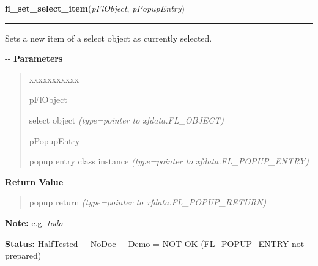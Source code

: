 \hspace{.8\funcindent}\begin{boxedminipage}{\funcwidth}

    \raggedright \textbf{fl\_set\_select\_item}(\textit{pFlObject}, \textit{pPopupEntry})

    \vspace{-1.5ex}

    \rule{\textwidth}{0.5\fboxrule}
\setlength{\parskip}{2ex}

Sets a new item of a select object as currently selected.

-{}-
\setlength{\parskip}{1ex}
      \textbf{Parameters}
      \vspace{-1ex}

      \begin{quote}
        \begin{Ventry}{xxxxxxxxxxx}

          \item[pFlObject]


select object
            {\it (type=pointer to xfdata.FL\_OBJECT)}

          \item[pPopupEntry]


popup entry class instance
            {\it (type=pointer to xfdata.FL\_POPUP\_ENTRY)}

        \end{Ventry}

      \end{quote}

      \textbf{Return Value}
    \vspace{-1ex}

      \begin{quote}

popup return
      {\it (type=pointer to xfdata.FL\_POPUP\_RETURN)}

      \end{quote}

\textbf{Note:} 
e.g. \emph{todo}


\textbf{Status:} 
HalfTested + NoDoc + Demo = NOT OK (FL\_POPUP\_ENTRY not prepared)


    \end{boxedminipage}

    \label{xformslib:flselect:fl_get_select_item_by_value}

    \vspace{0.5ex}

